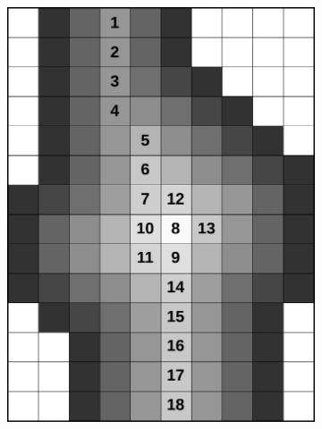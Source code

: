 \documentclass[review]{elsarticle}
\begin{document}
\begin{figure}[t]
  \centering
  \begin{subfigure}[b]{.35\linewidth}
    \centering
    \includegraphics[width=\textwidth]{fig3a.png}
    \caption{}
    \label{fig:order_centerline}  
  \end{subfigure}%
  \hspace{1em}
  \begin{subfigure}[b]{.35\linewidth}
    \centering

\end{subfigure}
\end{figure}
\end{document}
